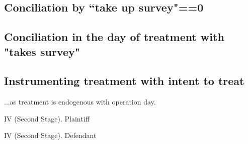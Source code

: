 \documentclass[12pt]{article}
\theoremstyle{named}
\newcommand{\folder}{./Effect}
\begin{document}
\scriptsize{}


\pagebreak

\subsection*{Conciliation by ``take up survey"==0}


\scriptsize{}

\scriptsize{}

\scriptsize{}

\scriptsize{}


\pagebreak

\subsection*{Conciliation in the day of treatment with "takes survey"}

\begin{center}
\scriptsize{}
\end{center}

\begin{center}
\scriptsize{}
\end{center}

\begin{center}
\scriptsize{}
\end{center}

\begin{center}
\scriptsize{}
\end{center}

\pagebreak


\begin{landscape}
\subsection*{Instrumenting treatment with intent to treat}

...as treatment is endogenous with operation day.


\begin{table}[H]\centering \caption{IV (Second Stage). Plaintiff}
\begin{center}
\scriptsize{}
\end{center}
\end{table}
\begin{table}[H]\centering \caption{IV (Second Stage). Defendant}
\begin{center}
\scriptsize{}
\end{center}
\end{table}


\end{landscape}
\end{document}
